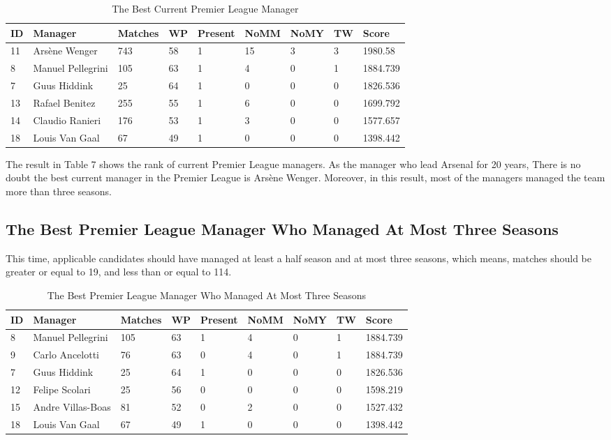 \documentclass[12pt,a4paper]{article}
\begin{document}
\begin{table}[h]
    \centering
    \caption{The Best Current Premier League Manager}
    \begin{tabular}{lllllllll}
    \hline
    ID & Manager & Matches & WP & Present & NoMM & NoMY & TW & Score  \\
    \hline\hline
    11 & Arsène Wenger &  743 & 58 & 1 & 15 & 3 & 3 & 1980.58 \\
    8 & Manuel Pellegrini &  105 & 63 & 1 & 4 & 0 & 1 & 1884.739  \\
    7 & Guus Hiddink & 25 & 64 & 1 & 0 & 0 & 0 & 1826.536  \\
    13 & Rafael Benitez &  255 & 55 & 1 & 6 & 0 & 0 & 1699.792  \\
    14 & Claudio Ranieri & 176 & 53 & 1 & 3 & 0 & 0 & 1577.657 \\
    18 & Louis Van Gaal & 67 & 49 & 1 & 0 & 0 & 0 & 1398.442  \\
     \hline\hline
    \end{tabular}
\end{table}

    The result in Table 7 shows the rank of current Premier League managers. As the manager who lead Arsenal for 20 years, There is no doubt the best current manager in the Premier League is Arsène Wenger. Moreover, in this result, most of the managers managed the team more than three seasons.
    
\subsection{The Best Premier League Manager Who Managed At Most Three Seasons}

    This time, applicable candidates should have managed at least a half season and at most three seasons, which means, matches should be greater or equal to 19, and less than or equal to 114.
    

\begin{table}[h]
    \centering
    \caption{The Best Premier League Manager Who Managed At Most Three Seasons}
    \begin{tabular}{lllllllll}
    \hline
    ID & Manager & Matches & WP & Present & NoMM & NoMY & TW & Score  \\
    \hline\hline
    8 & Manuel Pellegrini & 105 & 63 & 1 & 4 & 0 & 1 & 1884.739 \\
    9 & Carlo Ancelotti &  76 & 63 & 0 & 4 & 0 & 1 & 1884.739\\
    7 & Guus Hiddink & 25 & 64 & 1 & 0 & 0 & 0 & 1826.536  \\
    12 & Felipe Scolari & 25 & 56 & 0 & 0 & 0 & 0 & 1598.219  \\
    15 & Andre Villas-Boas & 81 & 52 & 0 & 2 & 0 & 0 & 1527.432\\
    18 & Louis Van Gaal & 67 & 49 & 1 & 0 & 0 & 0 & 1398.442  \\
     \hline\hline
    \end{tabular}
\end{table}
\end{document}

